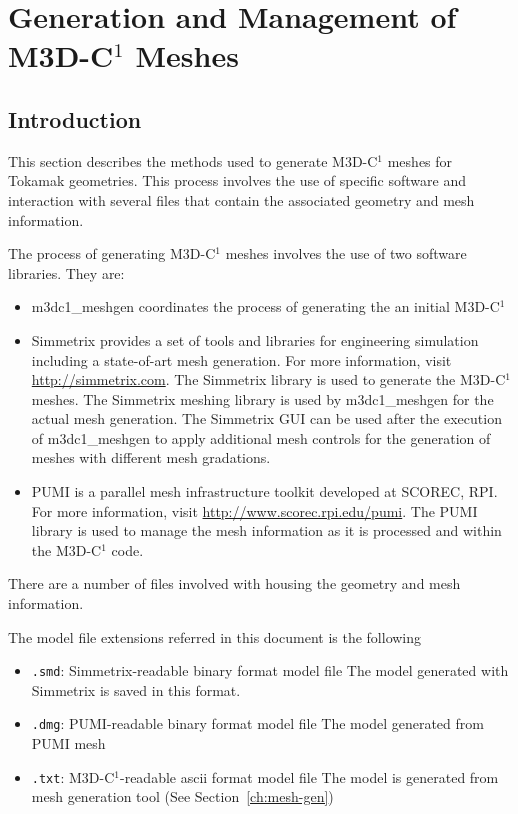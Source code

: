 \section{Generation and Management of M3D-C$^{1}$ Meshes}
\subsection{Introduction}

This section describes the methods used to generate M3D-C$^{1}$ meshes for Tokamak geometries. This process involves the use of specific software and interaction with several files that contain the associated geometry and mesh information.

The process of generating M3D-C$^{1}$ meshes involves the use of two software libraries. They are: 
\begin{itemize}
\item m3dc1\_meshgen coordinates the process of generating the an initial M3D-C$^{1}$
\item	Simmetrix provides a set of tools and libraries for engineering simulation including a state-of-art mesh generation. For more information, visit \href{http://simmetrix.com}{http://simmetrix.com}. The Simmetrix library is used to generate the M3D-C$^{1}$ meshes. The Simmetrix meshing library is used by m3dc1\_meshgen for the actual mesh generation. The Simmetrix GUI can be used after the execution of m3dc1\_meshgen to apply additional mesh controls for the generation of meshes with different mesh gradations. 
\item PUMI is a parallel mesh infrastructure toolkit developed at SCOREC, RPI. For more information, visit \href{http://www.scorec.rpi.edu/pumi}{http://www.scorec.rpi.edu/pumi}. The PUMI library is used to manage the mesh information as it is processed and within the M3D-C$^{1}$ code.
\end{itemize}

There are a number of files involved with housing the geometry and mesh information. 

The model file extensions referred in this document is the following
\begin{itemize}
\item \texttt{.smd}: Simmetrix-readable binary format model file  
\newline  The model generated with Simmetrix is saved in this format.
\item \texttt{.dmg}: PUMI-readable binary format model file
\newline	The model generated from PUMI mesh
\item	\texttt{.txt}: M3D-C$^{1}$-readable ascii format model file 
\newline	The model is generated from mesh generation tool (See Section~\ref{ch:mesh-gen})
\end{itemize}

